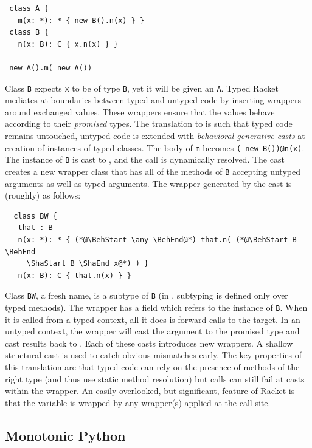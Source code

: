 \documentclass[a4paper,USenglish]{tex/lipics-v2016}
\newcommand{\code}[1]{{\tt #1}\xspace}
\begin{document}
\begin{lstlisting}
 class A {
   m(x: *): * { new B().n(x) } }
 class B {
   n(x: B): C { x.n(x) } }

 new A().m( new A())
\end{lstlisting}

\noindent Class \code B expects \code x to be of type \code B, yet it will
be given an \code A. Typed Racket mediates at boundaries between typed and
untyped code by inserting wrappers around exchanged values. These wrappers
ensure that the values behave according to their \emph{promised} types. The
translation to \kafka is such that typed code remains untouched, untyped
code is extended with \emph{behavioral generative casts} at creation of
instances of typed classes. The body of \code m becomes {\tt ({\BehStart
    \any \BehEnd}new B())@n(x)}.  The instance of \code B is cast to \any,
and the call is dynamically resolved. The cast creates a new wrapper class
that has all of the methods of \code B accepting untyped arguments as well
as typed arguments. The wrapper generated by the cast is (roughly) as
follows:

\begin{lstlisting}
  class BW {
   that : B
   n(x: *): * { (*@\BehStart \any \BehEnd@*) that.n( (*@\BehStart B \BehEnd
     \ShaStart B \ShaEnd x@*) ) }
   n(x: B): C { that.n(x) } }
\end{lstlisting}

\noindent Class \code{BW}, a fresh name, is a subtype of
\code B (in \kafka, subtyping is defined only over typed methods).  The
wrapper has a field \that which refers to the instance of \code B. When it
is called from a typed context, all it does is forward calls to the
target. In an untyped context, the wrapper will cast the argument to the
promised type and cast results back to \any. Each of these casts introduces
new wrappers. A shallow structural cast is used to catch obvious mismatches
early.  The key properties of this translation are that typed code can rely
on the presence of methods of the right type (and thus use static method
resolution) but calls can still fail at casts within the wrapper. An easily
overlooked, but significant, feature of Racket is that the \this variable is
wrapped by any wrapper(s) applied at the call site.

\subsection{Monotonic Python}
\end{document}
